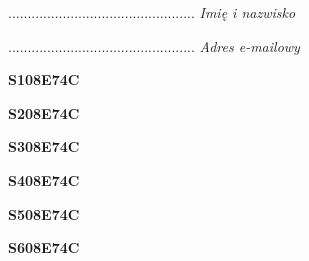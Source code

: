 \begin{turn}{90}\begin{minipage}{\linewidth} \vspace{20mm} ................................................  \textit{Imię i nazwisko}\end{minipage}\end{turn}

\begin{turn}{90}\begin{minipage}{\linewidth} \vspace{20mm} ................................................  \textit{Adres e-mailowy}\end{minipage}\end{turn}

\begin{turn}{90}\huge \begin{minipage}{\linewidth} \vspace{10mm}\textbf{S108E74C}\end{minipage}\end{turn}

\begin{turn}{90}\huge \begin{minipage}{\linewidth} \vspace{10mm}\textbf{S208E74C}\end{minipage}\end{turn}

\begin{turn}{90}\huge \begin{minipage}{\linewidth} \vspace{10mm}\textbf{S308E74C}\end{minipage}\end{turn}

\begin{turn}{90}\huge \begin{minipage}{\linewidth} \vspace{10mm}\textbf{S408E74C}\end{minipage}\end{turn}

\begin{turn}{90}\huge \begin{minipage}{\linewidth} \vspace{10mm}\textbf{S508E74C}\end{minipage}\end{turn}

\begin{turn}{90}\huge \begin{minipage}{\linewidth} \vspace{10mm}\textbf{S608E74C}\end{minipage}\end{turn}

